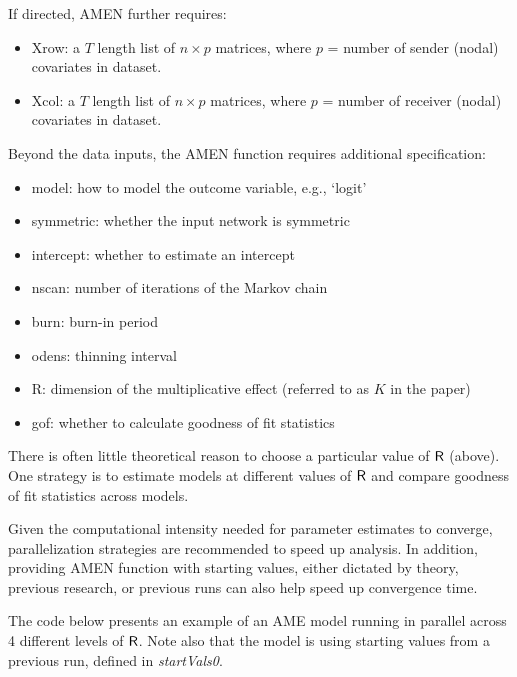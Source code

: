 If directed, AMEN further requires: 

\begin{itemize}[noitemsep,nolistsep]
    \item Xrow: a $T$ length list of $n\times p$ matrices, where $p$ = number of sender (nodal) covariates in dataset. 
    \item Xcol: a $T$ length list of $n\times p$ matrices, where $p$ = number of receiver (nodal) covariates in dataset. 
\end{itemize}

Beyond the data inputs, the AMEN function requires additional specification: 

\begin{itemize}
    \item model: how to model the outcome variable, e.g., `logit'
    \item symmetric: whether the input network is symmetric
    \item intercept: whether to estimate an intercept
    \item nscan: number of iterations of the Markov chain
    \item burn: burn-in period
    \item odens: thinning interval
    \item R: dimension of the multiplicative effect (referred to as $K$ in the paper)
    \item gof: whether to calculate goodness of fit statistics
\end{itemize}

There is often little theoretical reason to choose a particular value of $\sf{R}$ (above). One strategy is to estimate models at different values of $\sf{R}$ and compare goodness of fit statistics across models. 

Given the computational intensity needed for parameter estimates to converge, parallelization strategies are recommended to speed up analysis. In addition, providing AMEN function with starting values, either dictated by theory, previous research, or previous runs can also help speed up convergence time. 

The code below presents an example of an AME model running in parallel across 4 different levels of $\sf{R}$. Note also that the model is using starting values from a previous run, defined in \textit{startVals0}. 

